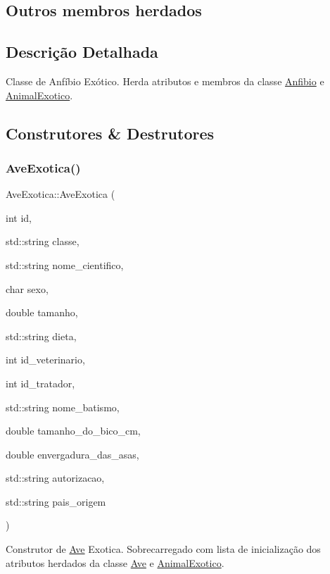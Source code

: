 \subsection*{Outros membros herdados}


\subsection{Descrição Detalhada}
Classe de Anfíbio Exótico. Herda atributos e membros da classe \hyperlink{classAnfibio}{Anfibio} e \hyperlink{classAnimalExotico}{Animal\+Exotico}. 

\subsection{Construtores \& Destrutores}
\mbox{\label{classAveExotica_a22c3fa1e0a5cf02e6ecc7c04bea8ce97}} 
\subsubsection{\texorpdfstring{Ave\+Exotica()}{AveExotica()}}
{\footnotesize\ttfamily Ave\+Exotica\+::\+Ave\+Exotica (\begin{DoxyParamCaption}\item[{int}]{id,  }\item[{std\+::string}]{classe,  }\item[{std\+::string}]{nome\+\_\+cientifico,  }\item[{char}]{sexo,  }\item[{double}]{tamanho,  }\item[{std\+::string}]{dieta,  }\item[{int}]{id\+\_\+veterinario,  }\item[{int}]{id\+\_\+tratador,  }\item[{std\+::string}]{nome\+\_\+batismo,  }\item[{double}]{tamanho\+\_\+do\+\_\+bico\+\_\+cm,  }\item[{double}]{envergadura\+\_\+das\+\_\+asas,  }\item[{std\+::string}]{autorizacao,  }\item[{std\+::string}]{pais\+\_\+origem }\end{DoxyParamCaption})}

Construtor de \hyperlink{classAve}{Ave} Exotica. Sobrecarregado com lista de inicialização dos atributos herdados da classe \hyperlink{classAve}{Ave} e \hyperlink{classAnimalExotico}{Animal\+Exotico}. \mbox{\label{classAveExotica_a548f328d5fe687e37f96936f0024845e}} 
